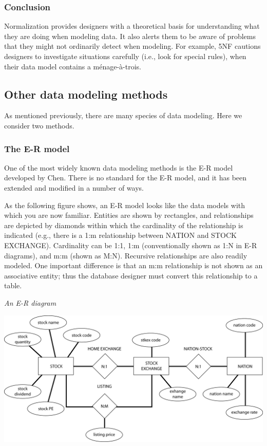 \documentclass[
]{article}
\begin{document}
\hypertarget{conclusion}{%
\subsubsection*{Conclusion}\label{conclusion}}

Normalization provides designers with a theoretical basis for
understanding what they are doing when modeling data. It also alerts
them to be aware of problems that they might not ordinarily detect when
modeling. For example, 5NF cautions designers to investigate situations
carefully (i.e., look for special rules), when their data model contains
a ménage-à-trois.

\hypertarget{other-data-modeling-methods}{%
\subsection*{Other data modeling methods}\label{other-data-modeling-methods}}

As mentioned previously, there are many species of data modeling. Here
we consider two methods.

\hypertarget{the-e-r-model}{%
\subsubsection*{The E-R model}\label{the-e-r-model}}

One of the most widely known data modeling methods is the E-R model
developed by Chen. There is no standard for the E-R model, and it has
been extended and modified in a number of ways.

As the following figure shows, an E-R model looks like the data models
with which you are now familiar. Entities are shown by rectangles, and
relationships are depicted by diamonds within which the cardinality of
the relationship is indicated (e.g., there is a 1:m relationship between
NATION and STOCK EXCHANGE). Cardinality can be 1:1, 1:m (conventionally
shown as 1:N in E-R diagrams), and m:m (shown as M:N). Recursive
relationships are also readily modeled. One important difference is that
an m:m relationship is not shown as an associative entity; thus the
database designer must convert this relationship to a table.

\emph{An E-R diagram}

\includegraphics{Figures/Chapter 8/E-R.png}
\end{document}
